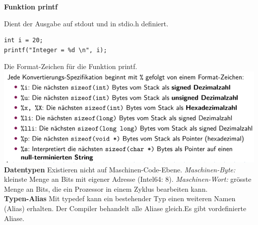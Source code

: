 \documentclass[7pt,landscape,a4paper]{scrartcl}
\begin{document}
\begin{multicols*}{4}
\textbf{Funktion printf} \\
\begin{minipage}[b]{0,4\linewidth}
Dient der Ausgabe auf stdout und in stdio.h definiert.
\end{minipage}
\begin{minipage}[b]{0,6\linewidth}
\begin{verbatim}
int i = 20;
printf("Integer = %d \n", i);
\end{verbatim}
\end{minipage}
Die Format-Zeichen für die Funktion printf.\\
\includegraphics[width=\linewidth]{printf}\\
\textbf{Datentypen} Existieren nicht auf Maschinen-Code-Ebene. \textit{Maschinen-Byte:} kleinste Menge an Bits mit eigener Adresse (Intel64: 8). \textit{Maschinen-Wort:} grösste Menge an Bits, die ein Prozessor in einem Zyklus bearbeiten kann.\\
\textbf{Typen-Alias} Mit typedef kann ein bestehender Typ einen weiteren Namen (Alias) erhalten. Der Compiler behandelt alle Aliase gleich.Es gibt vordefinierte Aliase.\\

\end{multicols*}
\end{document}

